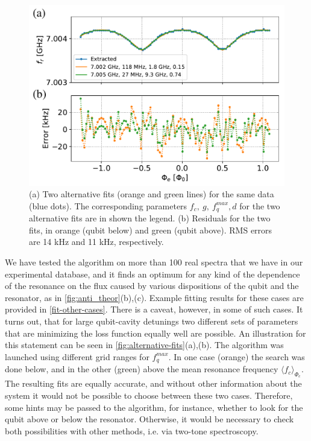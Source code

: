 \documentclass[%
 aip,
 amsmath,amssymb,
 reprint,%
]{revtex4-1}
\begin{document}
\begin{figure}
\centering
\includegraphics[width=\linewidth]{alternative_fits}
\caption{(a) Two alternative fits (orange and green lines) for the same data (blue dots). The corresponding parameters $f_c,\ g,\ f_{q}^{max}, d$ for the two alternative fits are in shown the legend. (b) Residuals for the two fits, in orange (qubit below) and green (qubit above). RMS errors are 14 kHz and 11 kHz, respectively.}
\label{fig:alternative-fits}
\end{figure}

We have tested the algorithm on more than 100 real spectra that we have in our experimental database, and it finds an optimum for any kind of the dependence of the resonance on the flux caused by various dispositions of the qubit and the resonator, as in \autoref{fig:anti_theor}(b),(c). Example fitting results for these cases are provided in \autoref{fit-other-cases}. There is a caveat, however, in some of such cases. It turns out, that for large qubit-cavity detunings two different sets of parameters that are minimizing the loss function equally well are possible. An illustration for this statement can be seen in \autoref{fig:alternative-fits}(a),(b). The algorithm was launched using different grid ranges for $f_q^{max}$. In one case (orange) the search was done below, and in the other (green) above the mean resonance frequency $\langle f_c\rangle_{\Phi_e}$. The resulting fits are equally accurate, and without other information about the system it would not be possible to choose between these two cases. Therefore, some hints may be passed to the algorithm, for instance, whether to look for the qubit above or below the resonator. Otherwise, it would be necessary to check both possibilities with other methods, i.e. via two-tone spectroscopy.
\end{document}
